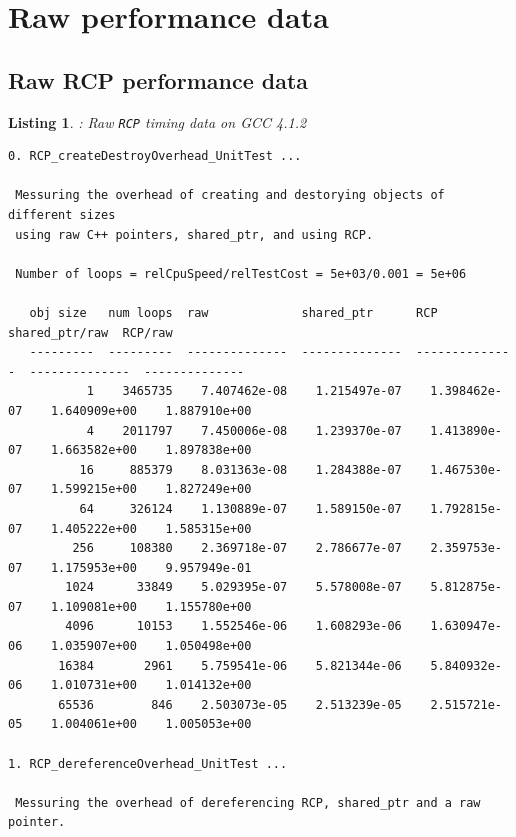 \documentclass[pdf,ps2pdf,11pt]{SANDreport}
\newtheorem{listing}{Listing}
\begin{document}
%
{}\section{Raw performance data}
\label{apdx:raw-perf-data}
%

%
{}\subsection{Raw RCP performance data}
\label{apdx:raw-rcp-perf-data}
%

\begin{listing}: Raw {}\texttt{RCP} timing data on GCC 4.1.2  \\
\label{listing:RCP-GCC-Timings}
{\scriptsize\begin{verbatim}
0. RCP_createDestroyOverhead_UnitTest ... 
 
 Messuring the overhead of creating and destorying objects of different sizes
 using raw C++ pointers, shared_ptr, and using RCP.
 
 Number of loops = relCpuSpeed/relTestCost = 5e+03/0.001 = 5e+06
 
   obj size   num loops  raw             shared_ptr      RCP             shared_ptr/raw  RCP/raw       
   ---------  ---------  --------------  --------------  --------------  --------------  --------------
           1    3465735    7.407462e-08    1.215497e-07    1.398462e-07    1.640909e+00    1.887910e+00
           4    2011797    7.450006e-08    1.239370e-07    1.413890e-07    1.663582e+00    1.897838e+00
          16     885379    8.031363e-08    1.284388e-07    1.467530e-07    1.599215e+00    1.827249e+00
          64     326124    1.130889e-07    1.589150e-07    1.792815e-07    1.405222e+00    1.585315e+00
         256     108380    2.369718e-07    2.786677e-07    2.359753e-07    1.175953e+00    9.957949e-01
        1024      33849    5.029395e-07    5.578008e-07    5.812875e-07    1.109081e+00    1.155780e+00
        4096      10153    1.552546e-06    1.608293e-06    1.630947e-06    1.035907e+00    1.050498e+00
       16384       2961    5.759541e-06    5.821344e-06    5.840932e-06    1.010731e+00    1.014132e+00
       65536        846    2.503073e-05    2.513239e-05    2.515721e-05    1.004061e+00    1.005053e+00

1. RCP_dereferenceOverhead_UnitTest ... 
 
 Messuring the overhead of dereferencing RCP, shared_ptr and a raw pointer.
 

\end{verbatim}}
\end{listing}
\end{document}
